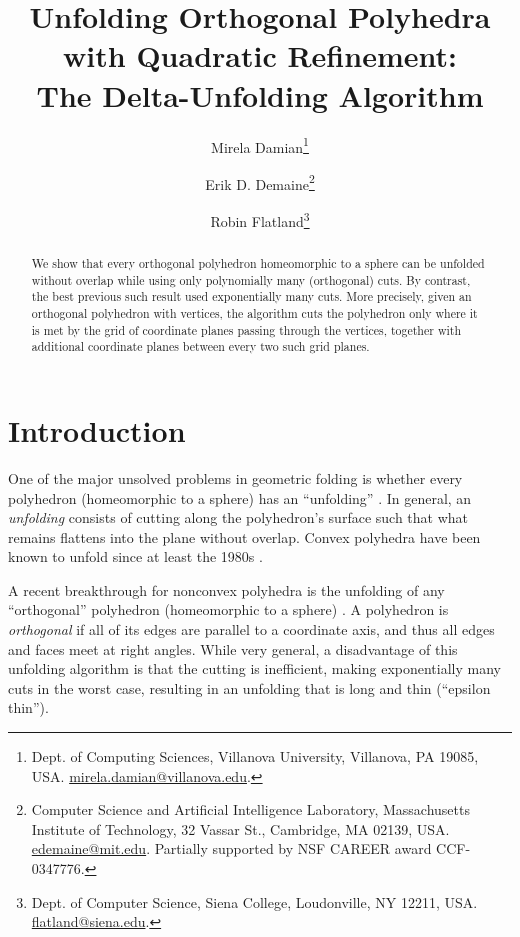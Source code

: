 \documentclass[11pt]{article}
\begin{document}
\title{Unfolding Orthogonal Polyhedra with Quadratic Refinement:\\
The Delta-Unfolding Algorithm}
\author{Mirela Damian\thanks{Dept. of Computing Sciences, Villanova University, Villanova,
    PA 19085, USA.
   \protect\url{mirela.damian@villanova.edu}.}
\and
Erik D. Demaine\thanks{Computer Science and Artificial Intelligence Laboratory,
       Massachusetts Institute of Technology,
       32 Vassar St., Cambridge, MA 02139, USA. \protect\url{edemaine@mit.edu}.
       Partially supported by NSF CAREER award CCF-0347776.}
\and
Robin Flatland\thanks{Dept. of Computer Science, Siena College, Loudonville, NY 12211, USA.
    \protect\url{flatland@siena.edu}.}
}

\date{}
\maketitle

\begin{abstract}
  We show that every orthogonal polyhedron homeomorphic to a sphere can be
  unfolded without overlap while using only polynomially many (orthogonal) cuts.
  By contrast, the best previous such result used exponentially many cuts.
  More precisely, given an orthogonal polyhedron with  vertices,
  the algorithm cuts the polyhedron only where it is met by
  the grid of coordinate planes passing through the vertices,
  together with  additional coordinate planes
  between every two such grid planes.
\end{abstract}

\section{Introduction}

One of the major unsolved problems in geometric folding is whether every
polyhedron (homeomorphic to a sphere) has an ``unfolding''
\cite{Bern-Demaine-Eppstein-Kuo-Mantler-Snoeyink-2003,Demaine-O'Rourke-2007}.
In general, an \emph{unfolding} consists of cutting along the polyhedron's
surface such that what remains flattens into the plane without overlap.
Convex polyhedra have been known to unfold
since at least the 1980s \cite[Sec.~24.1.1]{Demaine-O'Rourke-2007}.

A recent breakthrough for nonconvex polyhedra is the unfolding of
any ``orthogonal'' polyhedron (homeomorphic to a sphere)
\cite{Damian-Flatland-O'Rourke-2007-epsilon}.
A polyhedron is \emph{orthogonal} if all of its edges are parallel
to a coordinate axis, and thus all edges and faces meet at right angles.
While very general, a disadvantage of this unfolding algorithm
is that the cutting is inefficient,
making exponentially many cuts in the worst case, 
resulting in an unfolding that is long and thin (``epsilon thin'').
         
\end{document}
